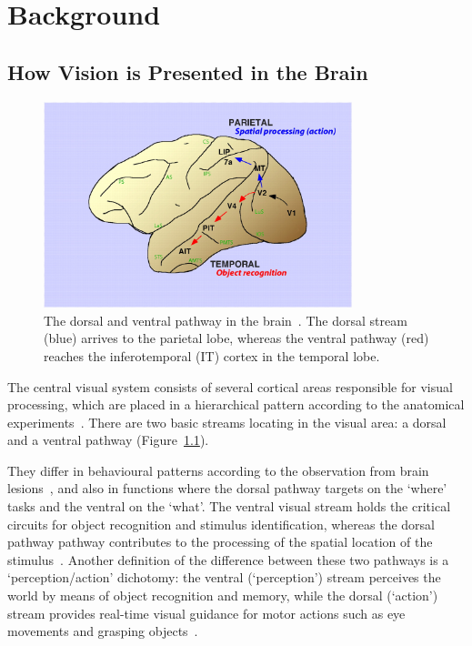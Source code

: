\chapter{Background}
\label{cha:bkg}




\section{How Vision is Presented in the Brain}
\label{sec:bio}

\begin{figure}
	\centering
	\includegraphics[width=0.8\textwidth]{pics_report/twoPaths.jpg}
	\caption{The dorsal and ventral pathway in the brain~\cite{lehky2007comparison}.
	The dorsal stream (blue) arrives to the parietal lobe, whereas the ventral pathway (red) reaches the inferotemporal (IT) cortex in the temporal lobe.}
	\label{Fig:TwoPath}
\end{figure}
The central visual system consists of several cortical areas responsible for visual processing, which are placed in a hierarchical pattern according to the anatomical experiments~\cite{felleman1991distributed}.
There are two basic streams locating in the visual area: a dorsal and a ventral pathway (Figure~\ref{Fig:TwoPath}).

They differ in behavioural patterns according to the observation from brain lesions~\cite{prado2005two}, and also in functions where the dorsal pathway targets on the `where' tasks and the ventral on the `what'.
The ventral visual stream holds the critical circuits for object recognition and stimulus identification, whereas the dorsal pathway pathway contributes to the processing of the spatial location of the stimulus~\cite{prado2005two, Ungerleider1994157}.
Another definition of the difference between these two pathways is a `perception/action' dichotomy: the ventral (`perception') stream perceives the world by means of object recognition and memory, while the dorsal (`action') stream provides real-time visual guidance for motor actions such as eye movements and grasping objects~\cite{goodale1992separate}. 

